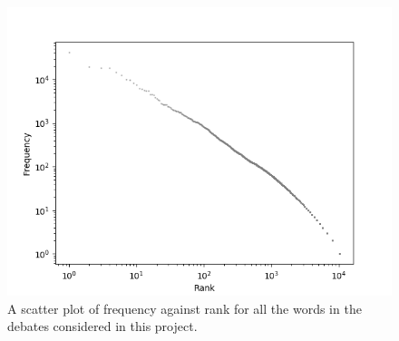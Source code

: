 \documentclass[12pt,a4paper,twoside,openright]{report}
\begin{document}
\\\\
\begin{figure}
	\begin{center}
		\includegraphics[scale=1]{figs/bigzipf.png}
	\end{center}
	\caption{A scatter plot of frequency against rank for all the words in the debates considered in this project.}
	\label{fig:bigzipf}
\end{figure}
\end{document}
